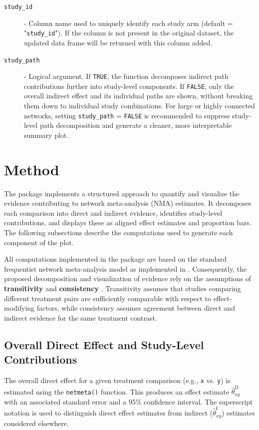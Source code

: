 \begin{description}
  \item[\texttt{study\_id}] - Column name used to uniquely identify each study arm (default = "\texttt{study\_id}"). If the column is not present in the original dataset, the updated data frame will be returned with this column added. 

  \item[\texttt{study\_path}] - Logical argument. If \texttt{TRUE}, the function decomposes indirect path contributions further into study-level components. If \texttt{FALSE}, only the overall indirect effect and its individual paths are shown, without breaking them down to individual study combinations. For large or highly connected networks, setting \texttt{study\_path} = \texttt{FALSE} is recommended to suppress study-level path decomposition and generate a cleaner, more interpretable summary plot.

\end{description}

\section{Method}

The  package implements a structured approach to quantify and visualize the evidence contributing to network meta-analysis (NMA) estimates. It decomposes each comparison into direct and indirect evidence, identifies study-level contributions, and displays these as aligned effect estimates and proportion bars. The following subsections describe the computations used to generate each component of the plot.

All computations implemented in the  package are based on the standard frequentist network meta-analysis model as implemented in . Consequently, the proposed decomposition and visualization of evidence rely on the assumptions of \textbf{transitivity} and \textbf{consistency} \citep{Ahn2021NMA}. Transitivity assumes that studies comparing different treatment pairs are sufficiently comparable with respect to effect-modifying factors, while consistency assumes agreement between direct and indirect evidence for the same treatment contrast. 

\subsection{Overall Direct Effect and Study-Level Contributions}

The overall direct effect for a given treatment comparison (e.g., \texttt{x} vs. \texttt{y}) is estimated using the \texttt{netmeta()} function. This produces an effect estimate $\hat{\theta}^{\mathrm{D}}_{xy}$ with an associated standard error and a 95\% confidence interval. The superscript notation is used to distinguish direct effect estimates from indirect ($\hat{\theta}^{\mathrm{I}}_{xy}$) estimates considered elsewhere.

